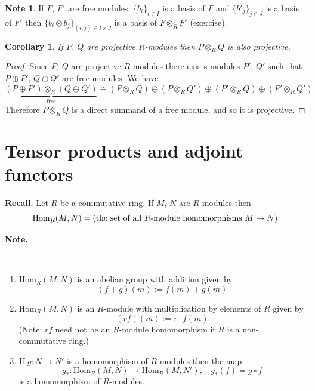 \documentclass[12pt, letterpaper, oneside]{article}
\theoremstyle{plain}
\newtheorem{corollary}[theorem]{Corollary}
\theoremstyle{definition}
\newtheorem{note}[theorem]{Note}
\newcommand{\Hom}{\mathrm{Hom}}
\newcommand{\benu}{\begin{enumerate}}
\newcommand{\eenu}{\end{enumerate}}
\newcommand{\vs}{\vskip 5mm}
\begin{document}
\vs\vs

\begin{note}
If $F$, $F'$ are free modules, $\{b_{i}\}_{i\in I}$ is a basis of $F$ and
$\{b'_{j}\}_{j\in J}$ is a basis of $F'$ then $\{b_{i}\otimes b_{j}\}_{(i, j)\in I\times J}$
is a basis of $F\otimes_{R}F'$ (exercise).
\end{note}


\vs\vs

\begin{corollary}
If $P$, $Q$ are projective $R$-modules then $P\otimes_{R} Q$ is also projective. 
\end{corollary}

\vs 

\begin{proof}
Since $P$, $Q$ are projective $R$-modules there exists modules $P'$, $Q'$ such that 
$P\oplus P'$, $Q\oplus Q'$ are free modules. 
We have 
$$\underbrace{(P\oplus P')\otimes_{R}(Q\oplus Q')}_{\text{free}} \cong (P\otimes_{R}Q) \oplus 
(P\otimes_{R}Q') \oplus (P'\otimes_{R}Q) \oplus (P'\otimes_{R}Q')$$
Therefore $P\otimes_{R} Q$ is a direct summand of a free module, and so it is projective. 

\end{proof}












\newpage
\section{Tensor products and adjoint functors}
\label{SEC_TENSORPRODADJOINT}




\textbf{Recall.} Let $R$ be a commutative ring. If $M$, $N$ are $R$-modules then 
$$\Hom_{R}(M, N) = \text{(the set of all $R$-module homomorphisms $ M\to N$)}$$


\textbf{Note.}

\vskip -13mm

\ 
\benu
\item $\Hom_{R}(M, N)$ is an abelian group with addition given by 
$$(f+g)(m) := f(m) + g(m)$$
\item $\Hom_{R}(M, N)$ is an $R$-module with multiplication by elements of $R$ 
given by
$$(rf)(m) :=  r\cdot f(m)$$ 
(Note: $rf$ need not be an $R$-module homomorphism if $R$ is a non-commu\-ta\-tive ring.)
\item If $g\colon N \to N'$ is a homomorphism of $R$-modules then the map 
$$g_{\ast}\colon \Hom_{R}(M, N) \to \Hom_{R}(M, N'), \ \ \ \ g_{\ast}(f) = g\circ f$$
is a homomorphism of $R$-modules. 
\eenu
\end{document}
